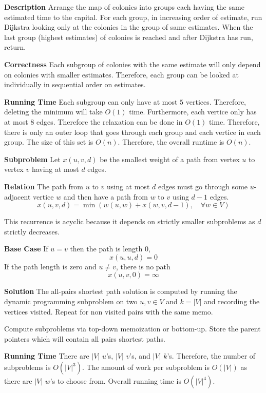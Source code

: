 \documentclass[12pt,twoside]{article}
\begin{document}
\begin{problems}
\newpage
\problem  %

{\bf Description} Arrange the map of colonies into groups each having the
same estimated time to the capital. For each group, in increasing order of
estimate, run Dijkstra looking only at the colonies in the group of same
estimates. When the last group (highest estimates) of colonies is reached and
after Dijkstra has run, return.

{\bf Correctness} Each subgroup of colonies with the same estimate will only
depend on colonies with smaller estimates. Therefore, each group can be
looked at individually in sequential order on estimates.

{\bf Running Time} Each subgroup can only have at most $5$ vertices.
Therefore, deleting the minimum will take $O(1)$ time. Furthermore, each
vertice only has at most $8$ edges. Therefore the relaxation can be done in
$O(1)$ time. Therefore, there is only an outer loop that goes through each
group and each vertice in each group. The size of this set is $O(n)$.
Therefore, the overall runtime is $O(n)$.

\newpage
\problem  %

\begin{problemparts}
\problempart %

{\bf Subproblem} Let $x(u, v, d)$ be the smallest weight of a path from
vertex $u$ to vertex $v$ having at most $d$ edges.

{\bf Relation} The path from $u$ to $v$ using at most $d$ edges must go
through some $u$-adjacent vertice $w$ and then have a path from $w$ to $v$
using $d - 1$ edges.
$$ x(u, v, d) = \min(w(u, w) + x(w, v, d - 1),\quad \forall w \in V) $$

This recurrence is acyclic because it depends on strictly smaller subproblems
as $d$ strictly decreases.

{\bf Base Case} If $u = v$ then the path is length $0$,
$$ x(u, u, d) = 0 $$
If the path length is zero and $u \neq v$, there is no path
$$ x(u, v, 0) = \infty $$

{\bf Solution} The all-pairs shortest path solution is computed by running
the dynamic programming subproblem on two $u, v \in V$ and $k = |V|$ and
recording the vertices visited. Repeat for non visited pairs with the same
memo.

Compute subproblems via top-down memoization or bottom-up. Store the parent
pointers which will contain all pairs shortest paths.

{\bf Running Time} There are $|V|$ $u$'s, $|V|$ $v$'s, and $|V|$ $k$'s.
Therefore, the number of subproblems is $O(|V|^3)$. The amount of work per
subproblem is $O(|V|)$ as there are $|V|$ $w$'s to choose from. Overall
running time is $O(|V|^4)$.


\end{problemparts}
\end{problems}
\end{document}
